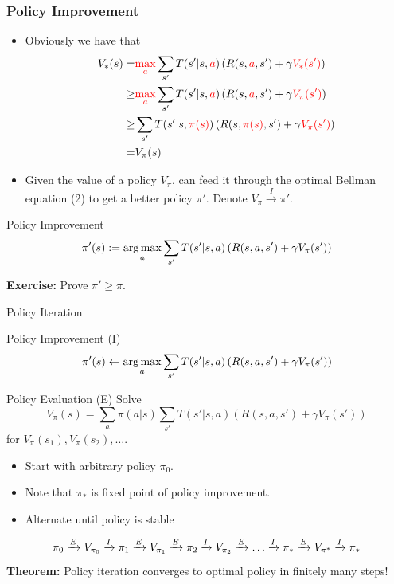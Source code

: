 \begin{frame}
	\frametitle{Policy Improvement}
	\begin{itemize}
		\item Obviously we have that
		\begin{align}
		V_*(s) = & \textcolor{red}{\max_a} \sum_{s'} T(s' | s, \textcolor{red}{a}) \left( R(s,\textcolor{red}{a},s') + \gamma \textcolor{red}{V_*(s')} \right) \\
		\geq 
		& \textcolor{red}{\max_a} \sum_{s'} T(s' | s, \textcolor{red}{a}) \left( R(s,\textcolor{red}{a},s') + \gamma \textcolor{red}{ V_{\pi}(s') } \right) \\
		\geq & \sum_{s'} T(s' | s, \textcolor{red}{\pi(s)}) \left( R(s,\textcolor{red}{\pi(s)},s') + \gamma \textcolor{red}{V_\pi(s')} \right) \\
         = & V_\pi(s)
		\end{align}
		\pause
		
		\item Given the value of a policy $V_\pi$, can feed it through the optimal Bellman
		equation (2) to get a better policy $\pi'$. Denote $V_\pi \overset{I}{\rightarrow} \pi'$.
	\end{itemize}
\pause
\begin{block}{Policy Improvement}
$$
\pi'(s) := \operatorname*{arg\,max}_a \sum_{s'} T(s' | s,a) 
\left( R(s,a,s') + \gamma V_{\pi}(s') \right)
$$
\end{block}
\textbf{Exercise:} Prove $\pi' \geq \pi$.
\end{frame}


\begin{frame}{Policy Iteration}

\begin{block}{Policy Improvement (I)}
	$$
	\pi'(s) \leftarrow \operatorname*{arg\,max}_a \sum_{s'} T(s' | s,a) 
	\left( R(s,a,s') + \gamma V_{\pi}(s') \right)
	$$
\end{block}

	\begin{block}{Policy Evaluation (E)}
	Solve
	$$
	V_\pi(s) = \sum_{a} \pi(a | s) \sum_{s'} T(s'|s,a) \left( R(s,a,s') + \gamma V_\pi(s') \right) 
	$$ for $V_\pi(s_1), V_\pi(s_2), \ldots$.
\end{block}

\pause
\begin{itemize}
	\item Start with arbitrary policy $\pi_0$.
	\item Note that $\pi_*$ is fixed point of policy improvement.
	\item Alternate until policy is stable
\end{itemize}
$$
\pi_0 \xrightarrow{E} V_{\pi_0} \xrightarrow{I} \pi_1 \xrightarrow{E} V_{\pi_1} \xrightarrow{E} \pi_2 \xrightarrow{I} V_{\pi_2}
\xrightarrow{E} \ldots \xrightarrow{I} \pi_* \xrightarrow{E} V_{\pi^*} \xrightarrow{I} \pi_* 
$$
\pause
\textbf{Theorem:} Policy iteration converges to optimal policy in finitely 
many steps!
\end{frame}


